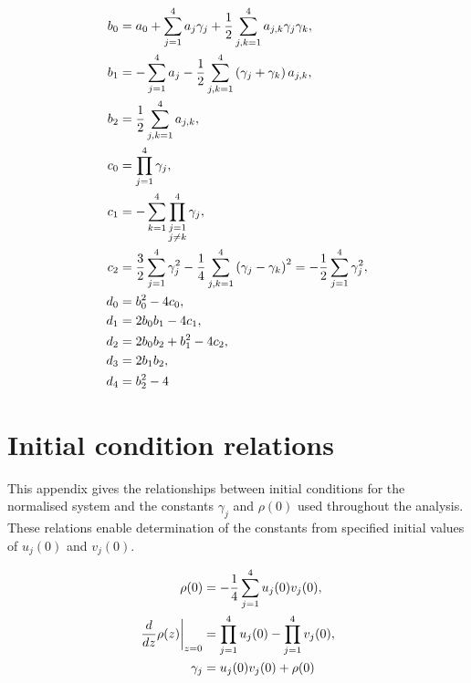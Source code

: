 \documentclass[11pt,a4paper]{article}
\numberwithin{equation}{section}
\begin{document}
\begin{align}
{b}_{0} &= {a}_{0} + \sum_{j=1}^{4} {a}_{j} {\gamma}_{j} + \frac{1}{2}\sum\limits_{j,k=1}^{4} {a}_{j,k} {\gamma}_{j} {\gamma}_{k}, \notag \\
{b}_{1} &= - \sum_{j=1}^{4} {a}_{j} - \frac{1}{2}\sum\limits_{j,k=1}^{4} \left({\gamma}_{j} + {\gamma}_{k}\right) {a}_{j,k}, \notag \\
{b}_{2} &= \frac{1}{2}\sum\limits_{j,k=1}^{4} {a}_{j,k}, \notag \\
{c}_{0} &= \prod_{j=1}^{4} {\gamma}_{j}, \notag \\
{c}_{1} &= - \sum_{k=1}^{4} \prod_{\substack{j=1 \\ j \ne k}}^{4} {\gamma}_{j}, \notag \\
{c}_{2} &= \frac{3}{2} \sum_{j=1}^{4} {\gamma}_{j}^{2} - \frac{1}{4}\sum\limits_{j,k=1}^{4} \left({\gamma}_{j} - {\gamma}_{k}\right)^{2} = - \frac{1}{2}\sum_{j=1}^{4} {\gamma}_{j}^{2}, \notag \\
{d}_{0} &= {b}_{0}^{2} - 4 {c}_{0}, \notag \\
{d}_{1} &= 2 {b}_{0} {b}_{1} - 4 {c}_{1}, \notag \\
{d}_{2} &= 2 {b}_{0} {b}_{2} + {b}_{1}^{2} - 4 {c}_{2}, \notag \\
{d}_{3} &= 2 {b}_{1} {b}_{2}, \notag \\
{d}_{4} &= {b}_{2}^{2} - 4
\end{align}


\section{Initial condition relations}
\label{app:init-conds}

This appendix gives the relationships between initial conditions for the normalised system and the constants $\gamma_j$ and $\rho(0)$ used throughout the analysis.
These relations enable determination of the constants from specified initial values of $u_j(0)$ and $v_j(0)$.

\begin{align}
\rho{\left(0 \right)} &= - \frac{1}{4}\sum_{j=1}^{4} u_j{\left(0 \right)} v_j{\left(0 \right)}, \notag \\
\left. \frac{d}{d z} \rho{\left(z \right)} \right|_{\substack{ z=0 }} &= \prod_{j=1}^{4} u_j(0) - \prod_{j=1}^{4} v_j(0), \notag \\
{\gamma}_{j} &= u_j{\left(0\right)} v_j{\left(0 \right)} + \rho{\left(0 \right)}
\end{align}
\end{document}

